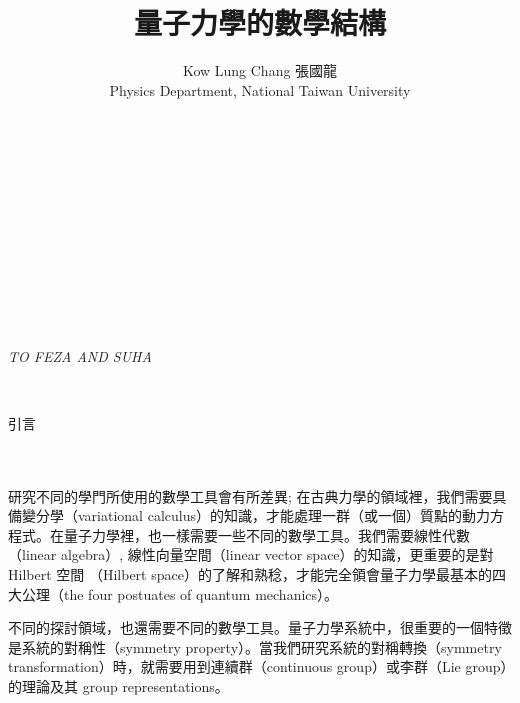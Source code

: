 \documentclass[a4paper,twoside,12pt]{book}
\begin{document}
\begin{titlepage}
\title{量子力學的數學結構}
\author{Kow Lung Chang 張國龍\\
Physics Department, National Taiwan University\\~\\~\\}
\maketitle
\end{titlepage}


%
%
%

\pagestyle{empty}
\frontmatter


~\\~\\~\\~\\~\\~\\~\\
\begin{center}
{\LARGE \sl TO FEZA AND SUHA}
\end{center}


~~~
\newpage

\setcounter{page}{7}
\pagestyle{plain}
\begin{raggedleft} {\LARGE 引言}\end{raggedleft}\\\\

研究不同的學門所使用的數學工具會有所差異; 在古典力學的領域裡，我們需要具備變分學（variational calculus）的知識，才能處理一群（或一個）質點的動力方程式。在量子力學裡，也一樣需要一些不同的數學工具。我們需要線性代數（linear algebra）, 線性向量空間（linear vector space）的知識，更重要的是對 Hilbert 空間 （Hilbert space）的了解和熟稔，才能完全領會量子力學最基本的四大公理（the four postuates of quantum mechanics）。

不同的探討領域，也還需要不同的數學工具。量子力學系統中，很重要的一個特徵是系統的對稱性（symmetry property）。當我們研究系統的對稱轉換（symmetry transformation）時，就需要用到連續群（continuous group）或李群（Lie group）的理論及其 group representations。
\end{document}
